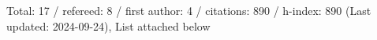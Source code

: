 Total: 17 / refereed: 8 / first author: 4 / citations: 890 / h-index: 890 (Last updated: 2024-09-24), List attached below